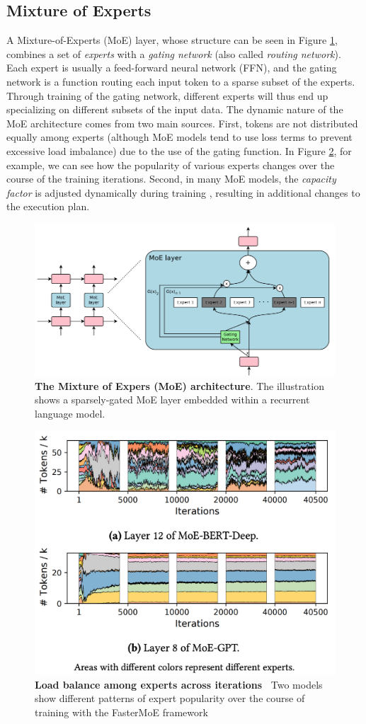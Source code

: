 \subsection{Mixture of Experts}\label{moe-layer}
A Mixture-of-Experts (MoE) layer, whose structure can be seen in Figure \ref{fig:moe-illustation}, combines a set of \textit{experts} with a \textit{gating network} (also called \textit{routing network}). Each expert is usually a feed-forward neural network (FFN), and the gating network is a function routing each input token to a sparse subset of the experts. Through training of the gating network, different experts will thus end up specializing on different subsets of the input data. The dynamic nature of the MoE architecture comes from two main sources. First, tokens are not distributed equally among experts (although MoE models tend to use loss terms to prevent excessive load imbalance) due to the use of the gating function. In Figure \ref{fig:expert_popularity}, for example, we can see how the popularity of various experts changes over the course of the training iterations. Second, in many MoE models, the \textit{capacity factor} is adjusted dynamically during training \cite{switch_transformer, tutel, dynamoe}, resulting in additional changes to the execution plan.
\begin{figure}[H]
    \centering
    \includegraphics[width=0.6\linewidth]{figures/moe-illustration.png}
    \caption{\textbf{The Mixture of Expers (MoE) architecture}. The illustration~\cite{shazeer2017} shows a sparsely-gated MoE layer embedded within a recurrent language model.}
    \label{fig:moe-illustation}
\end{figure}


\begin{figure}[H]
    \centering
    \includegraphics[width=0.6\linewidth]{figures/experts_popularity.png}
    \caption{\textbf{Load balance among experts across iterations~\cite{fastermoe}} Two models show different patterns of expert popularity over the course of training with the FasterMoE framework }
    \label{fig:expert_popularity}
\end{figure}

